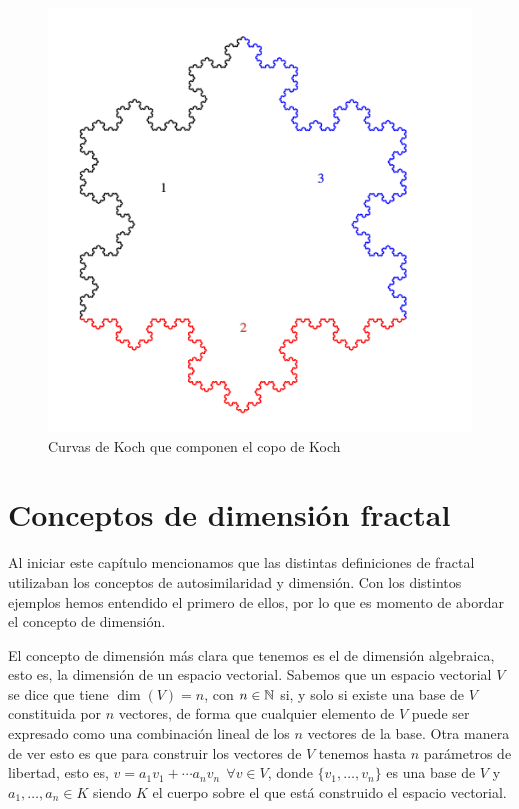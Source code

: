 \begin{figure} [ht]
\centering
\includegraphics[scale = 0.2]{img/copo-Koch-colores.png}
\caption{Curvas de Koch que componen el copo de Koch}
\label{fig:copo-Koch-colores}
\end{figure}


\section{Conceptos de dimensión fractal}
\label{section:dimension}

Al iniciar este capítulo mencionamos que las distintas definiciones de fractal utilizaban los conceptos de autosimilaridad y dimensión. Con los distintos ejemplos hemos entendido el primero de ellos, por lo que es momento de abordar el concepto de dimensión. 

El concepto de dimensión más clara que tenemos es el de dimensión algebraica, esto es, la dimensión de un espacio vectorial. Sabemos que un espacio vectorial $V$ se dice que tiene $\dim(V)=n$, con $n\in\mathbb{N}$ si, y solo si existe una base de $V$ constituida por $n$ vectores, de forma que cualquier elemento de $V$ puede ser expresado como una combinación lineal de los $n$ vectores de la base. Otra manera de ver esto es que para construir los vectores de $V$ tenemos hasta $n$ parámetros de libertad, esto es, $v=a_1 v_1 +\cdots a_n v_n \ \ \forall v\in V$, donde $\{v_1,\dots,v_n\}$ es una base de $V$ y $a_1,\dots,a_n\in K$ siendo $K$ el cuerpo sobre el que está construido el espacio vectorial.

